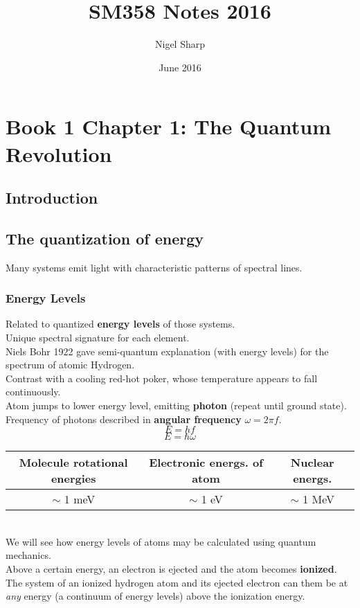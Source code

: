 \documentclass{article}
\title{SM358 Notes 2016}
\author{Nigel Sharp}
\date{June 2016}
\begin{document}
\maketitle

\section{Book 1 Chapter 1: The Quantum Revolution}
\subsection*{Introduction}
\subsection{The quantization of energy}
Many systems emit light with characteristic patterns of spectral lines.\\
\subsubsection{Energy Levels}
Related to quantized \textbf{energy levels} of those systems.\\
Unique spectral signature for each element.\\
Niels Bohr 1922 gave semi-quantum explanation (with energy levels) for the spectrum of atomic Hydrogen.\\
Contrast with a cooling red-hot poker, whose temperature appears to fall continuously.\\
Atom jumps to lower energy level, emitting \textbf{photon} (repeat until ground state).\\
Frequency of photons described in \textbf{angular frequency} $\omega = 2\pi f$.\\
$$ E = h f $$
$$ E = \hbar \omega $$
\begin{tabular}{|c|c|c|}
\hline
Molecule rotational energies & Electronic energs. of atom & Nuclear energs. \\
\hline
$\sim$ 1 meV & $\sim$ 1 eV & $\sim$ 1 MeV \\
\hline
\end{tabular}\\
We will see how energy levels of atoms may be calculated using quantum mechanics.\\
Above a certain energy, an electron is ejected and the atom becomes \textbf{ionized}. The system of an ionized hydrogen atom and its ejected electron can them be at \emph{any} energy (a continuum of energy levels) above the ionization energy.
\end{document}

